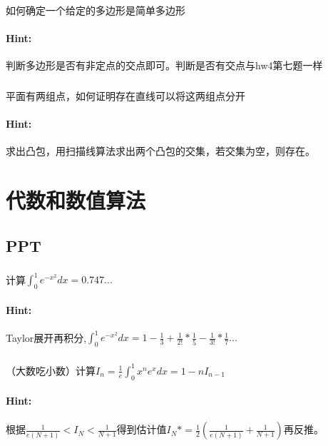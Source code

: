 \documentclass{article}
\begin{document}
     \subsubsection{}如何确定一个给定的多边形是简单多边形
     \paragraph{Hint:}判断多边形是否有非定点的交点即可。判断是否有交点与hw4第七题一样\\
     
     \subsubsection{}平面有两组点，如何证明存在直线可以将这两组点分开
     \paragraph{Hint:}求出凸包，用扫描线算法求出两个凸包的交集，若交集为空，则存在。\\

     
     \section{代数和数值算法}
     \subsection{PPT}
     
     \subsubsection{}计算$ \int ^{1}_{0} e^{-x^{2}}dx =0.747... $
     \paragraph{Hint:}Taylor展开再积分,$ \int^{1}_{0} e^{-x^{2}}dx = 1-\frac{1}{3}+\frac{1}{2!}*\frac{1}{5}-\frac{1}{3!}*\frac{1}{7}...$
     
     \subsubsection{}（大数吃小数）计算$ I_n = \frac{1}{e} \int ^{1}_{0} x^{n}e^{x}dx = 1 - nI_{n-1}$
     \paragraph{Hint:}根据$\frac{1}{e(N+1)}<I_{N}<\frac{1}{N+1}$得到估计值$I_{N}* = \frac{1}{2}(\frac{1}{e(N+1)}+\frac{1}{N+1})$再反推。
     
\end{document}
